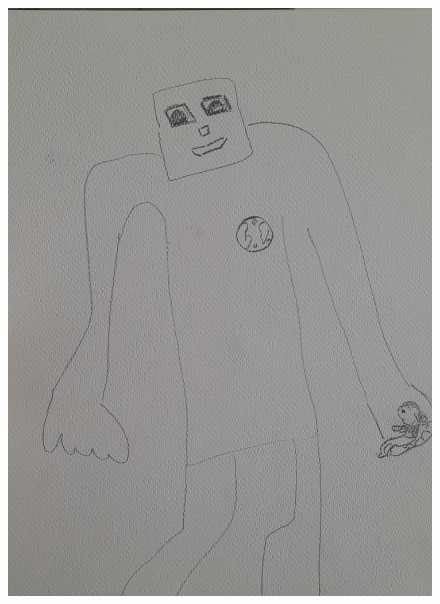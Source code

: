 \documentclass[12pt, a4paper, twoside]{book} %
\begin{document}
\begin{figure}[H]
	\centering
	\includegraphics[width=\textwidth]{./images/1f81324df1ed85.jpg}
\end{figure}
\end{document}
